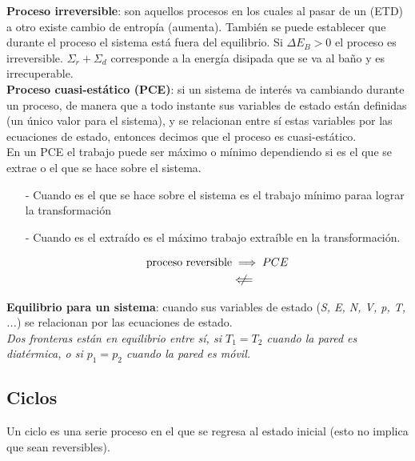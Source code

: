 \textbf{Proceso irreversible}: son aquellos procesos en los cuales al pasar de un (ETD) a otro existe cambio de entropía (aumenta). También se puede establecer que durante el proceso el sistema está fuera del equilibrio. Si $\Delta E_B > 0$ el proceso es irreversible. $\Sigma_r+\Sigma_d$ corresponde a la energía disipada que se va al baño y es irrecuperable.
\\

\textbf{Proceso cuasi-estático (PCE)}: si un sistema de interés va cambiando durante un proceso, de manera que a todo instante sus variables de estado están definidas (un único valor para el sistema), y se relacionan entre sí estas variables por las ecuaciones de estado, entonces decimos que el proceso es cuasi-estático. \\


En un PCE el trabajo puede ser máximo o mínimo dependiendo si es el que se extrae o el que se hace sobre el sistema.

\begin{itemize}
    \item[-] Cuando es el que se hace sobre el sistema es el trabajo mínimo paraa lograr la transformación
    \item[-] Cuando es el extraído es el máximo trabajo extraíble en la transformación. 
    
    \begin{equation}
    \begin{split}
        \text{proceso reversible} &\implies PCE\\
        &\centernot\Longleftarrow
    \end{split}
    \nonumber
\end{equation}
\end{itemize}

\textbf{Equilibrio para un sistema}: cuando sus variables de estado (\textit{S, E, N, V, p, T, ...}) se relacionan por las ecuaciones de estado.\\

\textit{Dos fronteras están en equilibrio entre sí, si $T_1 = T_2$ cuando la pared es diatérmica, o si $p_1 = p_2$ cuando la pared es móvil.}

\subsection{Ciclos}
\label{ciclos}
Un ciclo es una serie proceso en el que se regresa al estado inicial (esto no implica que sean reversibles).\\

